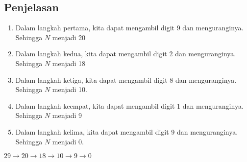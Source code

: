 \documentclass{article}
\begin{document}
\subsection*{Penjelasan}
\begin{enumerate}
    \item Dalam langkah pertama, kita dapat mengambil digit 9 dan menguranginya. Sehingga $N$ menjadi 20
    \item Dalam langkah kedua, kita dapat mengambil digit 2 dan menguranginya. Sehingga $N$ menjadi 18
    \item Dalam langkah ketiga, kita dapat mengambil digit 8 dan menguranginya. Sehingga $N$ menjadi 10.
    \item Dalam langkah keempat, kita dapat mengambil digit 1 dan menguranginya. Sehingga $N$ menjadi 9
    \item Dalam langkah kelima, kita dapat mengambil digit 9 dan menguranginya. Sehingga $N$ menjadi 0.
\end{enumerate}

\begin{center}
    $29 \rightarrow 20\rightarrow 18 \rightarrow10 \rightarrow9 \rightarrow0$
\end{center}

\pagebreak
\end{document}
